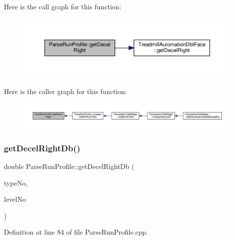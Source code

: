 Here is the call graph for this function\+:
\nopagebreak
\begin{figure}[H]
\begin{center}
\leavevmode
\includegraphics[width=350pt]{class_parse_run_profile_af21d7e6a341316569cf5905fe46a00b3_cgraph}
\end{center}
\end{figure}
Here is the caller graph for this function\+:
\nopagebreak
\begin{figure}[H]
\begin{center}
\leavevmode
\includegraphics[width=350pt]{class_parse_run_profile_af21d7e6a341316569cf5905fe46a00b3_icgraph}
\end{center}
\end{figure}
\mbox{\label{class_parse_run_profile_a2572529efbd0c733afb3a771223a859c}} 
\subsubsection{\texorpdfstring{get\+Decel\+Right\+Db()}{getDecelRightDb()}}
{\footnotesize\ttfamily double Parse\+Run\+Profile\+::get\+Decel\+Right\+Db (\begin{DoxyParamCaption}\item[{Q\+String}]{type\+No,  }\item[{Q\+String}]{level\+No }\end{DoxyParamCaption})}



Definition at line 84 of file Parse\+Run\+Profile.\+cpp.

